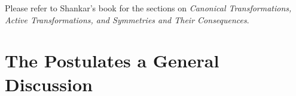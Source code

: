 \documentclass{book}
\theoremstyle{definition}
\begin{document}
Please refer to Shankar's book for the sections on \textit{Canonical Transformations, Active Transformations, and Symmetries and Their Consequences}.





\newpage




%
%



\section{The Postulates \textendash a General Discussion}
\end{document}
